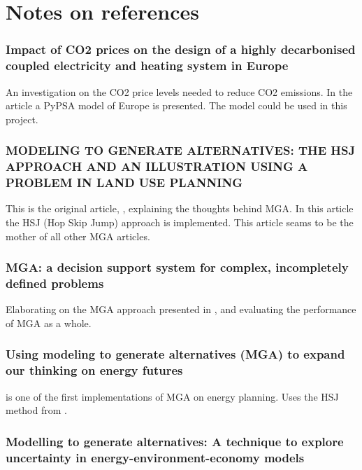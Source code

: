 

\section{Notes on references}

\subsubsection{Impact of CO2 prices on the design of a highly decarbonised coupled
electricity and heating system in Europe\cite{PypsaModel}}
An investigation on the CO2 price levels needed to reduce CO2 emissions. In the article a PyPSA model of Europe is presented. The model could be used in this project. 

\subsubsection{MODELING TO GENERATE ALTERNATIVES: THE HSJ
APPROACH AND AN ILLUSTRATION USING A
PROBLEM IN LAND USE PLANNING \cite{Brill_MGA_1982}}

This is the original article, \cite{Brill_MGA_1982}, explaining the thoughts behind MGA. In this article the HSJ (Hop Skip Jump) approach is implemented. This article seams to be the mother of all other MGA articles. 

\subsubsection{MGA: a decision support system for complex, incompletely defined problems\cite{Brill_MGA_1990}}
Elaborating on the MGA approach presented in \cite{Brill_MGA_1982}, and evaluating the performance of MGA as a whole. 

\subsubsection{Using modeling to generate alternatives (MGA) to expand our thinking on
energy futures\cite{DeCarolis_MGA}}

\cite{DeCarolis_MGA} is one of the first implementations of MGA on energy planning. Uses the HSJ method from \cite{Brill_MGA_1982}.

\subsubsection{Modelling to generate alternatives: A technique to explore uncertainty
in energy-environment-economy models \cite{MGA}}

